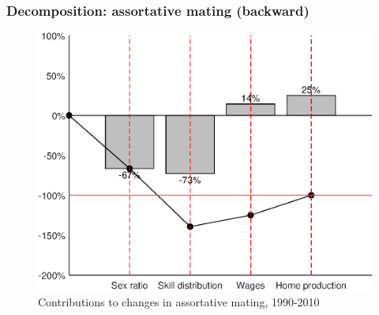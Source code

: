 \documentclass{beamer}
\begin{document}
\begin{frame}[noframenumbering]
	\frametitle{Decomposition: assortative mating (backward)}\label{slide:decomp_ms_back}
	\begin{figure}
		\centering
		\caption{Contributions to changes in assortative mating, 1990-2010}
		\includegraphics[width=.6\textwidth]{back_decomp_ms}
	\end{figure}
	\hyperlink{slide:decomp_ms}{}
\end{frame}
\end{document}
